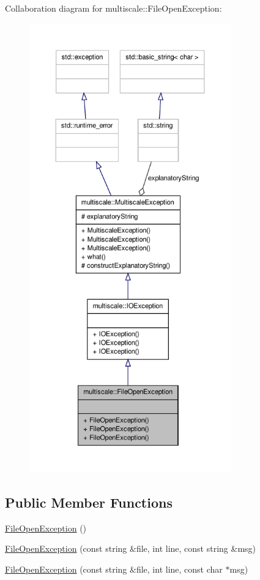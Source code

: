 \-Collaboration diagram for multiscale\-:\-:\-File\-Open\-Exception\-:
\nopagebreak
\begin{figure}[H]
\begin{center}
\leavevmode
\includegraphics[height=550pt]{classmultiscale_1_1FileOpenException__coll__graph}
\end{center}
\end{figure}
\subsection*{\-Public \-Member \-Functions}
\begin{DoxyCompactItemize}
\item 
\hyperlink{classmultiscale_1_1FileOpenException_a68434b875352a75a6692f42cbf2ece20}{\-File\-Open\-Exception} ()
\item 
\hyperlink{classmultiscale_1_1FileOpenException_ae574327fb5ac6e396d8c37263f8a2815}{\-File\-Open\-Exception} (const string \&file, int line, const string \&msg)
\item 
\hyperlink{classmultiscale_1_1FileOpenException_adddaf8af54fd3bdeb5f63d5a6736fd45}{\-File\-Open\-Exception} (const string \&file, int line, const char $\ast$msg)
\end{DoxyCompactItemize}


